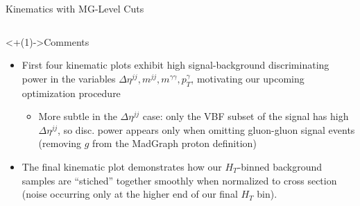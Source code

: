 \documentclass[handout]{beamer}
\begin{document}
\begin{frame}[label=current]{Kinematics with MG-Level Cuts}
    \begin{columns}
    \end{columns}
    \begin{columns}
        \begin{column}{0.1\linewidth}
        \end{column}
        \begin{column}{0.1\linewidth}
        \end{column}
    \end{columns}
    \begin{block}<+(1)->{Comments}
        \begin{itemize}[<+(1)->]
            \item First four kinematic plots exhibit high signal-background discriminating power in the variables $\Delta \eta^{jj}, m^{jj}, m^{\gamma \gamma}, p_T^{\gamma}$, motivating our upcoming optimization procedure
            \begin{itemize}[<+(1)->]
                \item More subtle in the $\Delta \eta^{jj}$ case: only the VBF subset of the signal has high $\Delta \eta^{jj}$, so disc. power appears only when omitting gluon-gluon signal events (removing $g$ from the MadGraph proton definition)
            \end{itemize}
            \item The final kinematic plot demonstrates how our $H_T$-binned background samples are ``stiched'' together smoothly when normalized to cross section (noise occurring only at the higher end of our final $H_T$ bin).
        \end{itemize}
    \end{block}
\end{frame}
\end{document}
